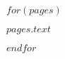 \documentclass{article}
\begin{document}
$for(pages)$

    \vspace*{\fill}

    \begin{mdframed}[style=textbox]
    $pages.text$
    \end{mdframed}

    \vspace*{0.05\textheight}

    \newpage
$endfor$
\end{document}
